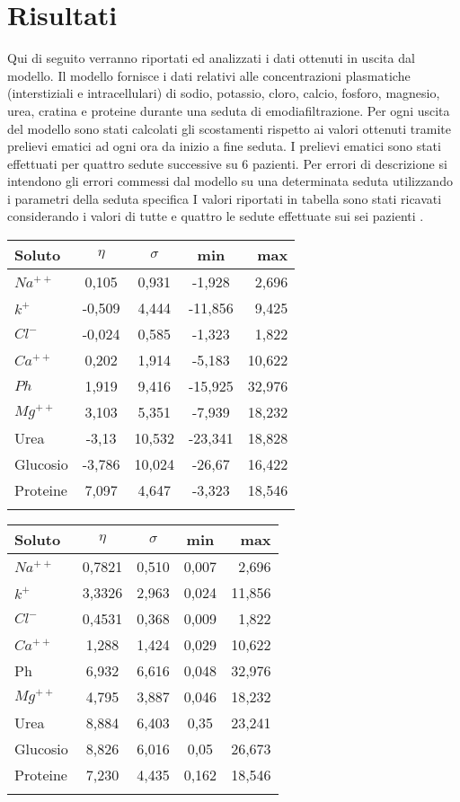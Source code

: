 \documentclass[10pt,twoside]{book}
\begin{document}
\chapter{Risultati}
Qui di seguito verranno riportati ed analizzati i dati ottenuti in uscita dal modello.
Il modello fornisce i dati relativi alle concentrazioni plasmatiche (interstiziali e intracellulari) di sodio, potassio, cloro, calcio, fosforo, magnesio, urea, cratina e proteine durante una seduta di emodiafiltrazione. Per ogni uscita del modello sono stati calcolati gli scostamenti rispetto ai valori ottenuti tramite prelievi ematici ad ogni ora da inizio a fine seduta. I prelievi ematici sono stati effettuati per quattro sedute successive su 6 pazienti. Per errori di descrizione si intendono gli errori commessi dal modello su una determinata seduta utilizzando i parametri della seduta specifica
I valori riportati in tabella sono stati ricavati considerando i valori di tutte e quattro le sedute effettuate sui sei pazienti .

\begin{tabular}{lcccr}
\toprule
Soluto & $\eta$ & $\sigma$ & min & max\\
\midrule
$Na^{++}$& 0,105 & 0,931 & -1,928 & 2,696\\
$k^{+}$ & -0,509 & 4,444 & -11,856 & 9,425\\ 
$Cl^{-}$& -0,024 & 0,585 & -1,323 & 1,822\\
$Ca^{++}$& 0,202 &  1,914 & -5,183 & 10,622\\
$Ph$ & 1,919 &  9,416 & -15,925 & 32,976\\
$Mg^{++}$& 3,103 &  5,351 & -7,939 & 18,232\\
Urea & -3,13 & 10,532 & -23,341 & 18,828\\
Glucosio & -3,786 & 10,024 & -26,67 & 16,422\\
Proteine & 7,097 &  4,647 & -3,323 & 18,546\\
\bottomrule
\caption{Errori di Descrizione }
\end{tabular}

\begin{tabular}{lcccr}
\toprule
Soluto & $\eta$ & $\sigma$ & min & max\\
\midrule
$Na^{++}$& 0,7821 & 0,510 & 0,007 & 2,696\\
$k^{+}$ & 3,3326 & 2,963 & 0,024 & 11,856\\ 
$Cl^{-}$ & 0,4531 & 0,368 & 0,009 & 1,822\\
$Ca^{++}$ & 1,288 &  1,424 & 0,029 & 10,622\\
Ph & 6,932 &  6,616 & 0,048 & 32,976\\
$Mg^{++}$& 4,795 &  3,887 & 0,046 & 18,232\\
Urea & 8,884 & 6,403 & 0,35 & 23,241\\
Glucosio & 8,826 & 6,016 & 0,05 & 26,673\\
Proteine & 7,230 &  4,435 & 0,162 & 18,546\\
\bottomrule
\caption{Errori di Descrizione Assoluti}
\end{tabular}
\end{document}
